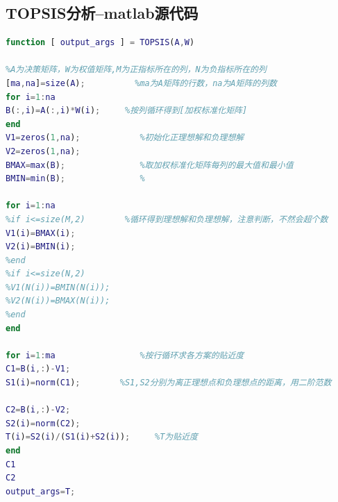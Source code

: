 \documentclass{whutmod}
\begin{document}
\subsection{TOPSIS分析--matlab源代码}
\begin{lstlisting}[language=matlab]
function [ output_args ] = TOPSIS(A,W)

%A为决策矩阵，W为权值矩阵,M为正指标所在的列，N为负指标所在的列
[ma,na]=size(A);          %ma为A矩阵的行数，na为A矩阵的列数
for i=1:na
B(:,i)=A(:,i)*W(i);     %按列循环得到[加权标准化矩阵]
end
V1=zeros(1,na);            %初始化正理想解和负理想解
V2=zeros(1,na);
BMAX=max(B);               %取加权标准化矩阵每列的最大值和最小值
BMIN=min(B);               %

for i=1:na
%if i<=size(M,2)        %循环得到理想解和负理想解，注意判断，不然会超个数
V1(i)=BMAX(i);
V2(i)=BMIN(i);
%end
%if i<=size(N,2)
%V1(N(i))=BMIN(N(i));
%V2(N(i))=BMAX(N(i));
%end
end

for i=1:ma                 %按行循环求各方案的贴近度
C1=B(i,:)-V1;
S1(i)=norm(C1);        %S1,S2分别为离正理想点和负理想点的距离，用二阶范数

C2=B(i,:)-V2;
S2(i)=norm(C2);
T(i)=S2(i)/(S1(i)+S2(i));     %T为贴近度
end
C1
C2
output_args=T;
\end{lstlisting}
\end{document}
